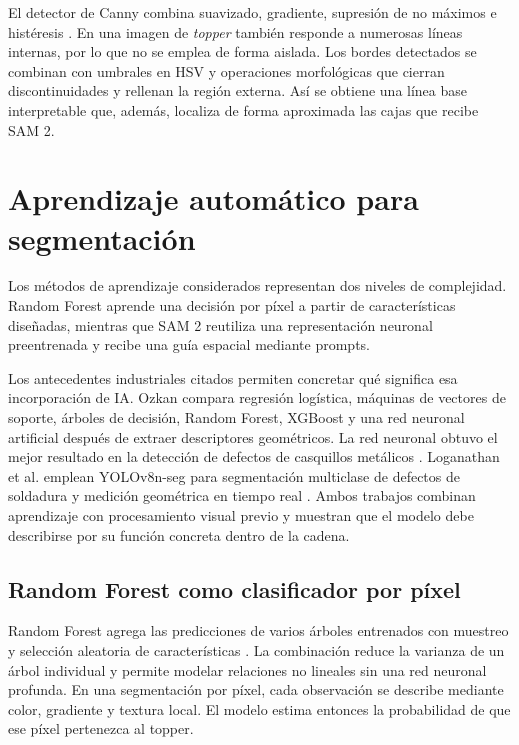 El detector de Canny combina suavizado, gradiente, supresión de no máximos e histéresis \cite{Canny1986}. En una imagen de \textit{topper} también responde a numerosas líneas internas, por lo que no se emplea de forma aislada. Los bordes detectados se combinan con umbrales en HSV y operaciones morfológicas que cierran discontinuidades y rellenan la región externa. Así se obtiene una línea base interpretable que, además, localiza de forma aproximada las cajas que recibe SAM 2.

\section{Aprendizaje automático para segmentación}

Los métodos de aprendizaje considerados representan dos niveles de complejidad. Random Forest aprende una decisión por píxel a partir de características diseñadas, mientras que SAM 2 reutiliza una representación neuronal preentrenada y recibe una guía espacial mediante prompts.

Los antecedentes industriales citados permiten concretar qué significa esa incorporación de IA. Ozkan compara regresión logística, máquinas de vectores de soporte, árboles de decisión, Random Forest, XGBoost y una red neuronal artificial después de extraer descriptores geométricos. La red neuronal obtuvo el mejor resultado en la detección de defectos de casquillos metálicos \cite{Ozkan2025}. Loganathan et al. emplean YOLOv8n-seg para segmentación multiclase de defectos de soldadura y medición geométrica en tiempo real \cite{Loganathan2026}. Ambos trabajos combinan aprendizaje con procesamiento visual previo y muestran que el modelo debe describirse por su función concreta dentro de la cadena.

\subsection{Random Forest como clasificador por píxel}

Random Forest agrega las predicciones de varios árboles entrenados con muestreo y selección aleatoria de características \cite{Breiman2001}. La combinación reduce la varianza de un árbol individual y permite modelar relaciones no lineales sin una red neuronal profunda. En una segmentación por píxel, cada observación se describe mediante color, gradiente y textura local. El modelo estima entonces la probabilidad de que ese píxel pertenezca al topper.


